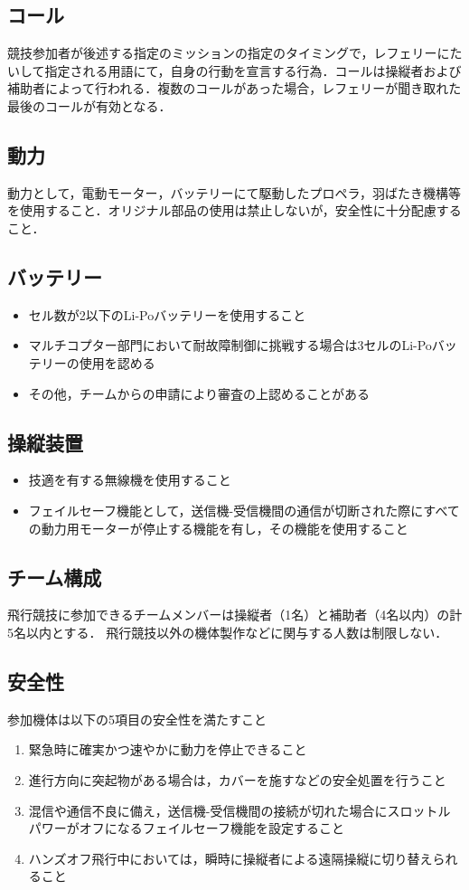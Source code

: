 \documentclass[a4paper,12pt,oneside]{jsarticle}
\begin{document}
\subsection{コール}
競技参加者が後述する指定のミッションの指定のタイミングで，レフェリーにたいして指定される用語にて，自身の行動を宣言する行為．コールは操縦者および補助者によって行われる．複数のコールがあった場合，レフェリーが聞き取れた最後のコールが有効となる．

\subsection{動力}
動力として，電動モーター，バッテリーにて駆動したプロペラ，羽ばたき機構等を使用すること．オリジナル部品の使用は禁止しないが，安全性に十分配慮すること．

\subsection{バッテリー}
\begin{itemize}
  \item セル数が2以下のLi-Poバッテリーを使用すること
  \item マルチコプター部門において耐故障制御に挑戦する場合は3セルのLi-Poバッテリーの使用を認める
  \item その他，チームからの申請により審査の上認めることがある
\end{itemize}

\subsection{操縦装置}
\begin{itemize}
  \item 技適を有する無線機を使用すること
  \item フェイルセーフ機能として，送信機-受信機間の通信が切断された際にすべての動力用モーターが停止する機能を有し，その機能を使用すること
\end{itemize}

\subsection{チーム構成}
飛行競技に参加できるチームメンバーは操縦者（1名）と補助者（4名以内）の計5名以内とする．
飛行競技以外の機体製作などに関与する人数は制限しない．

\subsection{安全性}
参加機体は以下の5項目の安全性を満たすこと
\begin{enumerate}
  \item 緊急時に確実かつ速やかに動力を停止できること
  \item 進行方向に突起物がある場合は，カバーを施すなどの安全処置を行うこと
  \item 混信や通信不良に備え，送信機-受信機間の接続が切れた場合にスロットルパワーがオフになるフェイルセーフ機能を設定すること
  \item ハンズオフ飛行中においては，瞬時に操縦者による遠隔操縦に切り替えられること
\end{enumerate}
\end{document}
